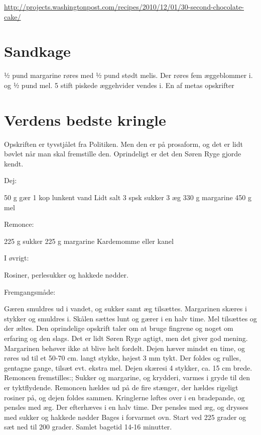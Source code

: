 \documentclass[
]{book}
\begin{document}
\url{http://projects.washingtonpost.com/recipes/2010/12/01/30-second-chocolate-cake/}

\hypertarget{sandkage}{%
\section{Sandkage}\label{sandkage}}

½ pund margarine røres med ½ pund stødt melis. Der røres fem æggeblommer i. og ½ pund mel. 5 stift piskede æggehvider vendes i.
En af metas opskrifter

\hypertarget{verdens-bedste-kringle}{%
\section{Verdens bedste kringle}\label{verdens-bedste-kringle}}

Opskriften er tyvstjålet fra Politiken. Men den er på prosaform, og det er lidt bøvlet når man skal fremstille den.
Oprindeligt er det den Søren Ryge gjorde kendt.

Dej:

50 g gær
1 kop lunkent vand
Lidt salt
3 spsk sukker
3 æg
330 g margarine
450 g mel

Remonce:

225 g sukker
225 g margarine
Kardemomme eller kanel

I øvrigt:

Rosiner, perlesukker og hakkede nødder.

Fremgangsmåde:

Gæren smuldres ud i vandet, og sukker samt æg tilsættes. Margarinen skæres i stykker og smuldres i. Skålen sættes lunt og gærer i en halv time.
Mel tilsættes og der æltes. Den oprindelige opskrift taler om at bruge fingrene og noget om erfaring og den slags. Det er lidt Søren Ryge agtigt, men det giver god mening. Margarinen behøver ikke at blive helt fordelt.
Dejen hæver mindst en time, og røres ud til et 50-70 cm. langt stykke, højest 3 mm tykt. Der foldes og rulles, gentagne gange, tilsæt evt. ekstra mel. Dejen skæresi 4 stykker, ca. 15 cm brede.
Remoncen fremstilles:; Sukker og margarine, og krydderi, varmes i gryde til den er tyktflydende.
Remoncen hældes ud på de fire stænger, der hældes rigeligt rosiner på, og dejen foldes sammen.
Kringlerne løftes over i en bradepande, og pensles med æg. Der efterhæves i en halv time.
Der pensles med æg, og drysses med sukker og hakkede nødder
Bages i forvarmet ovn. Start ved 225 grader og sæt ned til 200 grader. Samlet bagetid 14-16 minutter.
\end{document}
